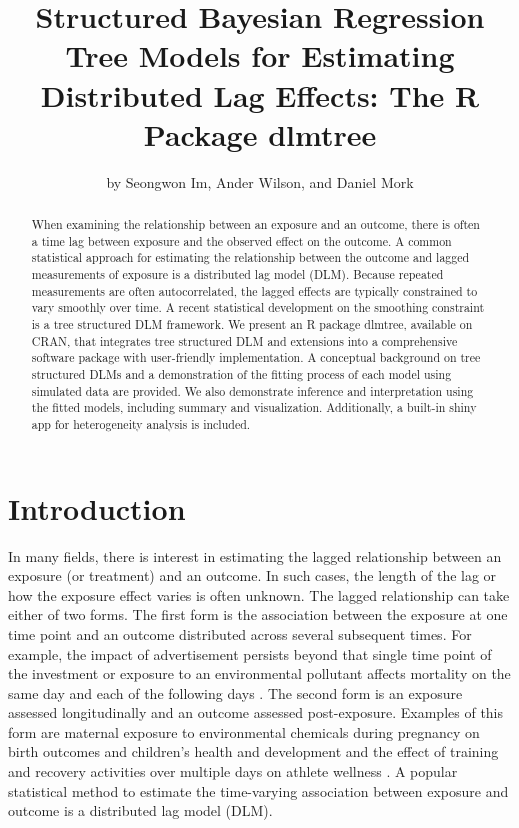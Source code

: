 \title{Structured Bayesian Regression Tree Models for Estimating Distributed Lag Effects: The R Package {dlmtree}}
\author{by Seongwon Im, Ander Wilson, and Daniel Mork}

\maketitle

\begin{abstract}
When examining the relationship between an exposure and an outcome, there is often a time lag between exposure and the observed effect on the outcome. A common statistical approach for estimating the relationship between the outcome and lagged measurements of exposure is a distributed lag model (DLM). Because repeated measurements are often autocorrelated, the lagged effects are typically constrained to vary smoothly over time. A recent statistical development on the smoothing constraint is a tree structured DLM framework. We present an R package dlmtree, available on CRAN, that integrates tree structured DLM and extensions into a comprehensive software package with user-friendly implementation. A conceptual background on tree structured DLMs and a demonstration of the fitting process of each model using simulated data are provided. We also demonstrate inference and interpretation using the fitted models, including summary and visualization. Additionally, a built-in shiny app for heterogeneity analysis is included.
\end{abstract}

\section{Introduction}

In many fields, there is interest in estimating the lagged relationship between an exposure (or treatment) and an outcome. In such cases, the length of the lag or how the exposure effect varies is often unknown. The lagged relationship can take either of two forms. The first form is the association between the exposure at one time point and an outcome distributed across several subsequent times. For example, the impact of advertisement persists beyond that single time point of the investment \citep{koyck_1954_econDLM, palda_1965_advertise}
or exposure to an environmental pollutant affects mortality on the same day and each of the following days \citep{schwartz_distributed_2000}. The second form is an exposure assessed longitudinally and an outcome assessed post-exposure. Examples of this form are maternal exposure to environmental chemicals during pregnancy on birth outcomes and children's health and development \citep{wilson_2017_bias,chiu2023prenatal, hsu_prenatal_2023} and the effect of training and recovery activities over multiple days on athlete wellness \citep{schliep_2021_wellness}. A popular statistical method to estimate the time-varying association between exposure and outcome is a distributed lag model (DLM).

